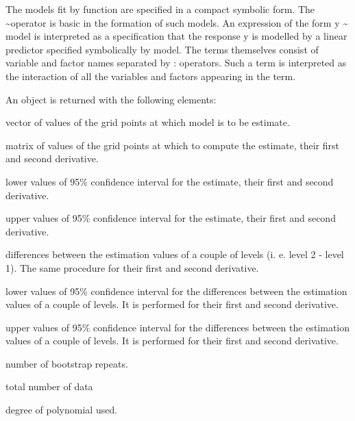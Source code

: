 %
\begin{Details}\relax
The models fit by  function are specified in a compact symbolic form. The \bsl{}\textasciitilde{}operator is basic in the formation of such models. An expression of the form y \textasciitilde{} model is interpreted as a specification that the response y is modelled by a linear predictor specified symbolically by model. The terms themselves consist of variable and factor names separated by : operators. Such a term is interpreted as the interaction of all the variables and factors appearing in the term.
\end{Details}
%
\begin{Value}
An object is returned with the following elements:
\begin{ldescription}
\item[\code{x}] vector of values of the grid points at which model is to be estimate.

\item[\code{p}] matrix of values of the grid points at which to compute the estimate, their first and second derivative.

\item[\code{pl}] lower values of  95\% confidence interval for the estimate, their first and second derivative.

\item[\code{pu}] upper values of  95\% confidence interval for the estimate, their first and second derivative.

\item[\code{diff}] differences between the estimation values of a couple of levels (i. e. level 2 - level 1). The same procedure for their first and second derivative.

\item[\code{diffl}] lower values of 95\% confidence interval for the differences between the estimation values of a couple of levels. It is performed for their first and second derivative.

\item[\code{diffu}] upper values of 95\% confidence interval for the differences between the estimation values of a couple of levels. It is performed for their first and second derivative.

\item[\code{nboot}] number of bootstrap repeats.

\item[\code{n}] total number of data

\item[\code{dp}] degree of polynomial used.


\end{ldescription}
\end{Value}
